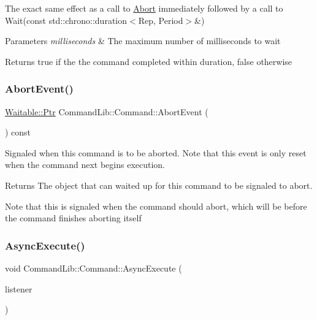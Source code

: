 The exact same effect as a call to \mbox{\hyperlink{class_command_lib_1_1_command_a247cbc7325e3b9d9d7044d449b989aa6}{Abort}} immediately followed by a call to Wait(const std\+::chrono\+::duration$<$\+Rep, Period$>$\&) 


\begin{DoxyParams}{Parameters}
{\em milliseconds} & The maximum number of milliseconds to wait\\
\hline
\end{DoxyParams}
\begin{DoxyReturn}{Returns}
true if the the command completed within \textquotesingle{}duration\textquotesingle{}, false otherwise
\end{DoxyReturn}
\mbox{\label{class_command_lib_1_1_command_a1fdc8e982866dbbfb763af5d755f76dd}} 
\subsubsection{\texorpdfstring{Abort\+Event()}{AbortEvent()}}
{\footnotesize\ttfamily \mbox{\hyperlink{class_command_lib_1_1_waitable_ac74b6b91e48220146eada76a31cf2d9b}{Waitable\+::\+Ptr}} Command\+Lib\+::\+Command\+::\+Abort\+Event (\begin{DoxyParamCaption}{ }\end{DoxyParamCaption}) const}



Signaled when this command is to be aborted. Note that this event is only reset when the command next begins execution. 

\begin{DoxyReturn}{Returns}
The object that can waited up for this command to be signaled to abort.
\end{DoxyReturn}


Note that this is signaled when the command should abort, which will be before the command finishes aborting itself\mbox{\label{class_command_lib_1_1_command_a44bad231a0f0a6de3d5405382d95f800}} 
\subsubsection{\texorpdfstring{Async\+Execute()}{AsyncExecute()}}
{\footnotesize\ttfamily void Command\+Lib\+::\+Command\+::\+Async\+Execute (\begin{DoxyParamCaption}\item[{\mbox{\hyperlink{class_command_lib_1_1_command_listener}{Command\+Listener}} $\ast$}]{listener }\end{DoxyParamCaption})}



